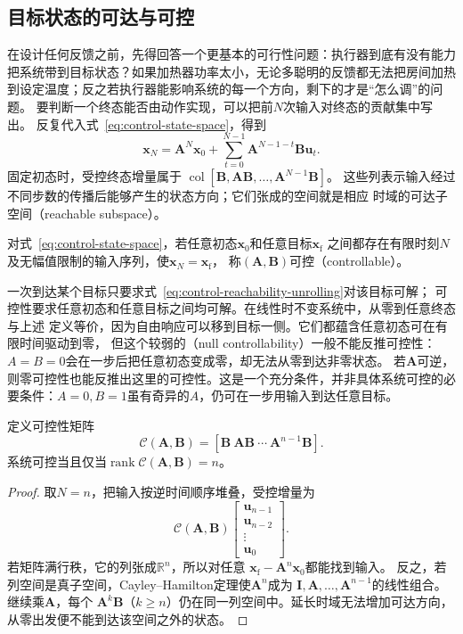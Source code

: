 \subsection{目标状态的可达与可控}
在设计任何反馈之前，先得回答一个更基本的可行性问题：执行器到底有没有能力把系统带到目标状态？如果加热器功率太小，无论多聪明的反馈都无法把房间加热到设定温度；反之若执行器能影响系统的每一个方向，剩下的才是“怎么调”的问题。
要判断一个终态能否由动作实现，可以把前$N$次输入对终态的贡献集中写出。
反复代入式~\eqref{eq:control-state-space}，得到
\begin{equation}
  \bm x_N=\bm A^N\bm x_0+
  \sum_{t=0}^{N-1}\bm A^{N-1-t}\bm B\bm u_t.
  \label{eq:control-reachability-unrolling}
\end{equation}
固定初态时，受控终态增量属于
$\operatorname{col}[\bm B,\bm A\bm B,\ldots,\bm A^{N-1}\bm B]$。
这些列表示输入经过不同步数的传播后能够产生的状态方向；它们张成的空间就是相应
时域的可达子空间（reachable subspace）。

\begin{definition}[可控性]
\label{def:control-controllability}
对式~\eqref{eq:control-state-space}，若任意初态$\bm x_0$和任意目标$\bm x_{\mathrm f}$
之间都存在有限时刻$N$及无幅值限制的输入序列，使$\bm x_N=\bm x_{\mathrm f}$，
称$(\bm A,\bm B)$可控（controllable）。
\end{definition}

一次到达某个目标只要求式~\eqref{eq:control-reachability-unrolling}对该目标可解；
可控性要求任意初态和任意目标之间均可解。在线性时不变系统中，从零到任意终态与上述
定义等价，因为自由响应可以移到目标一侧。它们都蕴含任意初态可在有限时间驱动到零，
但这个较弱的（null controllability）一般不能反推可控性：
$A=B=0$会在一步后把任意初态变成零，却无法从零到达非零状态。
若$\bm A$可逆，则零可控性也能反推出这里的可控性。这是一个充分条件，并非具体系统可控的必要条件：$A=0,B=1$虽有奇异的$A$，仍可在一步用输入到达任意目标。

\begin{theorem}[Kalman可控性秩判据]
\label{thm:control-controllability-rank}
定义可控性矩阵
\begin{equation}
  \mathcal C(\bm A,\bm B)
  =[\bm B\ \bm A\bm B\ \cdots\ \bm A^{n-1}\bm B].
  \label{eq:control-controllability-matrix}
\end{equation}
系统可控当且仅当$\operatorname{rank}\mathcal C(\bm A,\bm B)=n$。
\end{theorem}
\begin{proof}
取$N=n$，把输入按逆时间顺序堆叠，受控增量为
\[
  \mathcal C(\bm A,\bm B)
  \begin{bmatrix}\bm u_{n-1}\\ \bm u_{n-2}\\ \vdots\\ \bm u_0\end{bmatrix}.
\]
若矩阵满行秩，它的列张成$\mathbb R^n$，所以对任意
$\bm x_{\mathrm f}-\bm A^n\bm x_0$都能找到输入。
反之，若列空间是真子空间，Cayley--Hamilton定理使$\bm A^n$成为
$\bm I,\bm A,\ldots,\bm A^{n-1}$的线性组合。继续乘$\bm A$，每个
$\bm A^k\bm B$（$k\geq n$）仍在同一列空间中。延长时域无法增加可达方向，
从零出发便不能到达该空间之外的状态。
\end{proof}


